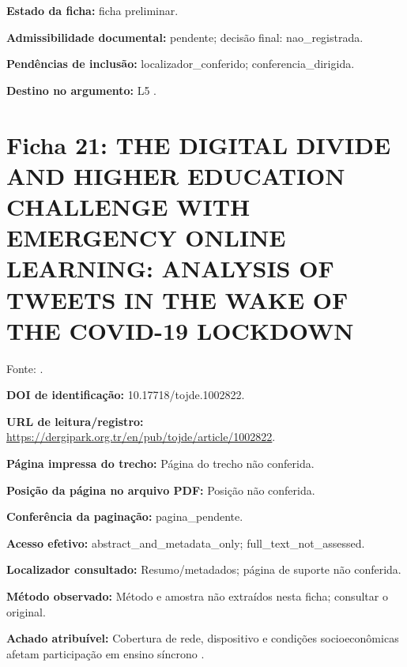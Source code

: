 \noindent\textbf{Estado da ficha:} ficha preliminar.\par\medskip

\noindent\textbf{Admissibilidade documental:} pendente; decisão final: nao\_registrada.\par\medskip

\noindent\textbf{Pendências de inclusão:} localizador\_conferido; conferencia\_dirigida.\par\medskip

\noindent\textbf{Destino no argumento:} L5 .

\clearpage\section*{Ficha 21: THE DIGITAL DIVIDE AND HIGHER EDUCATION CHALLENGE WITH EMERGENCY ONLINE LEARNING: ANALYSIS OF TWEETS IN THE WAKE OF THE COVID-19 LOCKDOWN}

Fonte: \citet{azionya2021}.

\noindent\textbf{DOI de identificação:} 10.17718/tojde.1002822.\par\medskip

\noindent\textbf{URL de leitura/registro:} \url{https://dergipark.org.tr/en/pub/tojde/article/1002822}.\par\medskip

\noindent\textbf{Página impressa do trecho:} Página do trecho não conferida.\par\medskip

\noindent\textbf{Posição da página no arquivo PDF:} Posição não conferida.\par\medskip

\noindent\textbf{Conferência da paginação:} pagina\_pendente.\par\medskip

\noindent\textbf{Acesso efetivo:} abstract\_and\_metadata\_only; full\_text\_not\_assessed.\par\medskip

\noindent\textbf{Localizador consultado:} Resumo/metadados; página de suporte não conferida.\par\medskip

\noindent\textbf{Método observado:} Método e amostra não extraídos nesta ficha; consultar o original.\par\medskip

\noindent\textbf{Achado atribuível:} Cobertura de rede, dispositivo e condições socioeconômicas afetam participação em ensino síncrono \citep{azionya2021}.\par\medskip


